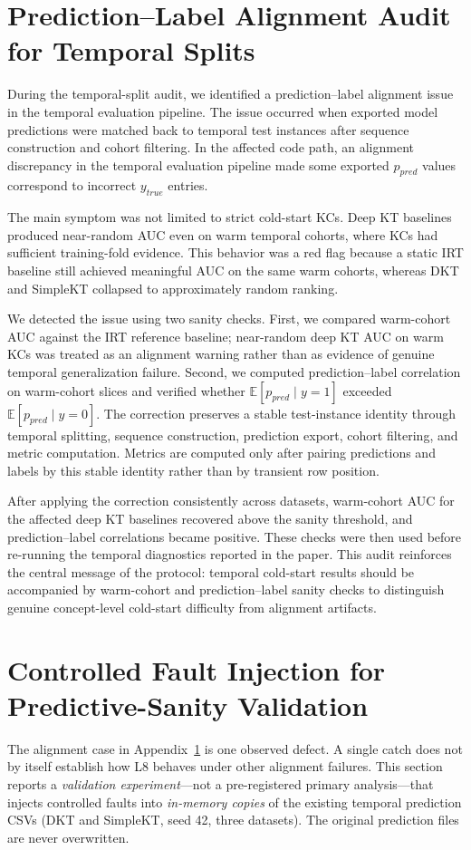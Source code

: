 \section{Prediction--Label Alignment Audit for Temporal Splits}
\label{app:alignment}
During the temporal-split audit, we identified a prediction--label alignment issue in the temporal evaluation pipeline. The issue occurred when exported model predictions were matched back to temporal test instances after sequence construction and cohort filtering. In the affected code path, an alignment discrepancy in the temporal evaluation pipeline made some exported $p_{pred}$ values correspond to incorrect $y_{true}$ entries.

The main symptom was not limited to strict cold-start KCs. Deep KT baselines produced near-random AUC even on warm temporal cohorts, where KCs had sufficient training-fold evidence. This behavior was a red flag because a static IRT baseline still achieved meaningful AUC on the same warm cohorts, whereas DKT and SimpleKT collapsed to approximately random ranking.

We detected the issue using two sanity checks. First, we compared warm-cohort AUC against the IRT reference baseline; near-random deep KT AUC on warm KCs was treated as an alignment warning rather than as evidence of genuine temporal generalization failure. Second, we computed prediction--label correlation on warm-cohort slices and verified whether $\mathbb{E}[p_{pred}\mid y=1]$ exceeded $\mathbb{E}[p_{pred}\mid y=0]$. The correction preserves a stable test-instance identity through temporal splitting, sequence construction, prediction export, cohort filtering, and metric computation. Metrics are computed only after pairing predictions and labels by this stable identity rather than by transient row position.

After applying the correction consistently across datasets, warm-cohort AUC for the affected deep KT baselines recovered above the sanity threshold, and prediction--label correlations became positive. These checks were then used before re-running the temporal diagnostics reported in the paper. This audit reinforces the central message of the protocol: temporal cold-start results should be accompanied by warm-cohort and prediction--label sanity checks to distinguish genuine concept-level cold-start difficulty from alignment artifacts.

\clearpage
\section{Controlled Fault Injection for Predictive-Sanity Validation}
\label{app:l8_fault}
The alignment case in Appendix~\ref{app:alignment} is one observed defect. A single catch does not by itself establish how L8 behaves under other alignment failures. This section reports a \emph{validation experiment}---not a pre-registered primary analysis---that injects controlled faults into \emph{in-memory copies} of the existing temporal prediction CSVs (DKT and SimpleKT, seed 42, three datasets). The original prediction files are never overwritten.

